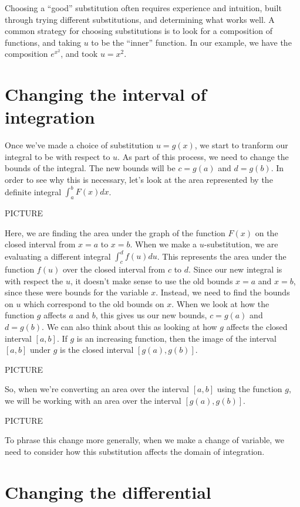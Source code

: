 \documentclass{ximera}
\begin{document}
Choosing a ``good'' substitution often requires experience and intuition, built through trying different substitutions, and determining what works well. A common strategy for choosing substitutions is to look for a composition of functions, and taking $u$ to be the ``inner'' function. In our example, we have the composition $e^{x^2}$, and took $u=x^2$. 

\section*{Changing the interval of integration}

Once we've made a choice of substitution $u=g(x)$, we start to tranform our integral to be with respect to $u$. As part of this process, we need to change the bounds of the integral. The new bounds will be $c = g(a)$ and $d = g(b)$. In order to see why this is necessary, let's look at the area represented by the definite integral $\int_a^b F(x)dx$. 

PICTURE

Here, we are finding the area under the graph of the function $F(x)$ on the closed interval from $x=a$ to $x=b$. When we make a $u$-substitution, we are evaluating a different integral $\int_c^d f(u)du$. This represents the area under the function $f(u)$ over the closed interval from $c$ to $d$. Since our new integral is with respect the $u$, it doesn't make sense to use the old bounds $x=a$ and $x=b$, since these were bounds for the variable $x$. Instead, we need to find the bounds on $u$ which correspond to the old bounds on $x$. When we look at how the function $g$ affects $a$ and $b$, this gives us our new bounds, $c=g(a)$ and $d = g(b)$. We can also think about this as looking at how $g$ affects the closed interval $[a,b]$. If $g$ is an increasing function, then the image of the interval $[a,b]$ under $g$ is the closed interval $[g(a), g(b)]$.

PICTURE

So, when we're converting an area over the interval $[a,b]$ using the function $g$, we will be working with an area over the interval $[g(a),g(b)]$.

PICTURE

To phrase this change more generally, when we make a change of variable, we need to consider how this substitution affects the domain of integration.

\section*{Changing the differential}
\end{document}
